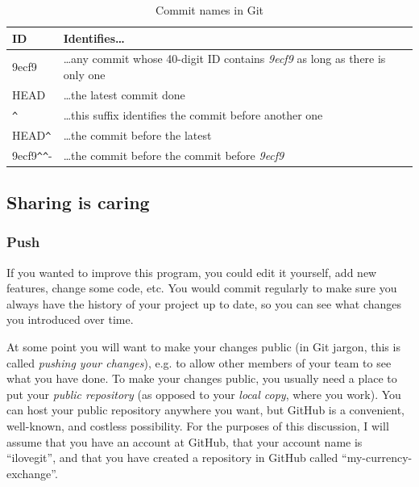 \begin{table}[hbtp]
  \centering
  \begin{tabular}{p{2cm}p{8cm}}
    ID & Identifies\ldots \\
    \hline
    9ecf9 & \ldots any commit whose 40-digit ID contains \emph{9ecf9}
    as long as there is only one \\
    HEAD & \ldots the latest commit done \\
    \verb+^+ & \ldots this suffix identifies the commit before another one \\ 
    HEAD\verb-^- & \ldots the commit before the latest \\
    9ecf9\verb-^^- & \ldots the commit before the commit before \emph{9ecf9} \\
  \end{tabular}
  \caption{Commit names in Git}
  \label{tab:tagnames}
\end{table}

\subsection{Sharing is caring}
\label{sec:sharing-caring}

\subsubsection{Push}
\label{sec:push}

If you wanted to improve this program, you could edit it yourself, add
new features, change some code, etc. You would commit regularly to
make sure you always have the history of your project up to date, so
you can see what changes you introduced over time. 

At some point you will want to make your changes public (in Git
jargon, this is called \emph{pushing your changes}), e.g. to allow
other members of your team to see what you have done. To make your
changes public, you usually need a place to put your \emph{public
repository} (as opposed to your \emph{local copy}, where you
work). You can host your public repository anywhere you want, but
GitHub is a convenient, well-known, and costless possibility. For the
purposes of this discussion, I will assume that you have an account at
GitHub, that your account name is ``ilovegit'', and that you have
created a repository in GitHub called ``my-currency-exchange''. 


